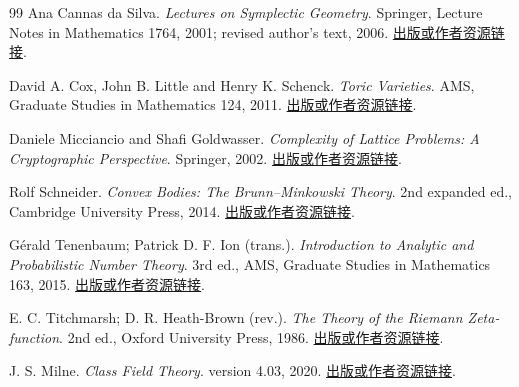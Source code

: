 \begin{thebibliography}{99}
 Ana Cannas da Silva. \emph{Lectures on Symplectic Geometry}. Springer, Lecture Notes in Mathematics 1764, 2001; revised author's text, 2006. \href{https://www.math.ist.utl.pt/~acannas/Books/symplectic.pdf}{出版或作者资源链接}.

 David A. Cox, John B. Little and Henry K. Schenck. \emph{Toric Varieties}. AMS, Graduate Studies in Mathematics 124, 2011. \href{https://doi.org/10.1090/gsm/124}{出版或作者资源链接}.

 Daniele Micciancio and Shafi Goldwasser. \emph{Complexity of Lattice Problems: A Cryptographic Perspective}. Springer, 2002. \href{https://doi.org/10.1007/978-1-4615-0897-7}{出版或作者资源链接}.

 Rolf Schneider. \emph{Convex Bodies: The Brunn--Minkowski Theory}. 2nd expanded ed., Cambridge University Press, 2014. \href{https://assets.cambridge.org/97811076/01017/frontmatter/9781107601017_frontmatter.pdf}{出版或作者资源链接}.

 Gérald Tenenbaum; Patrick D. F. Ion (trans.). \emph{Introduction to Analytic and Probabilistic Number Theory}. 3rd ed., AMS, Graduate Studies in Mathematics 163, 2015. \href{https://doi.org/10.1090/gsm/163}{出版或作者资源链接}.

 E. C. Titchmarsh; D. R. Heath-Brown (rev.). \emph{The Theory of the Riemann Zeta-function}. 2nd ed., Oxford University Press, 1986. \href{https://sites.math.rutgers.edu/~zeilberg/EM18/TitchmarshZeta.pdf}{出版或作者资源链接}.

 J. S. Milne. \emph{Class Field Theory}. version 4.03, 2020. \href{https://www.jmilne.org/math/CourseNotes/CFT.pdf}{出版或作者资源链接}.

\end{thebibliography}
